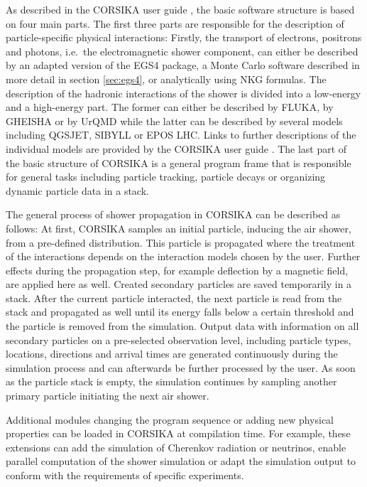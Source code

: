 As described in the CORSIKA user guide \cite{userguide}, the basic software structure is based on four main parts.
The first three parts are responsible for the description of particle-specific physical interactions:
Firstly, the transport of electrons, positrons and photons, i.e.\ the electromagnetic shower component, can either be described by an adapted version of the EGS4 package, a Monte Carlo software described in more detail in section \ref{sec:egs4}, or analytically using NKG formulas.
The description of the hadronic interactions of the shower is divided into a low-energy and a high-energy part.
The former can either be described by FLUKA, by GHEISHA or by UrQMD while the latter can be described by several models including QGSJET, SIBYLL or EPOS LHC.
Links to further descriptions of the individual models are provided by the CORSIKA user guide \cite{userguide}.
The last part of the basic structure of CORSIKA is a general program frame that is responsible for general tasks including particle tracking, particle decays or organizing dynamic particle data in a stack.

The general process of shower propagation in CORSIKA can be described as follows:
At first, CORSIKA samples an initial particle, inducing the air shower, from a pre-defined distribution.
This particle is propagated where the treatment of the interactions depends on the interaction models chosen by the user.
Further effects during the propagation step, for example deflection by a magnetic field, are applied here as well.
Created secondary particles are saved temporarily in a stack.
After the current particle interacted, the next particle is read from the stack and propagated as well until its energy falls below a certain threshold and the particle is removed from the simulation.
Output data with information on all secondary particles on a pre-selected observation level, including particle types, locations, directions and arrival times are generated continuously during the simulation process and can afterwards be further processed by the user.
As soon as the particle stack is empty, the simulation continues by sampling another primary particle initiating the next air shower.

Additional modules changing the program sequence or adding new physical properties can be loaded in CORSIKA at compilation time.
For example, these extensions can add the simulation of Cherenkov radiation or neutrinos, enable parallel computation of the shower simulation or adapt the simulation output to conform with the requirements of specific experiments.  

